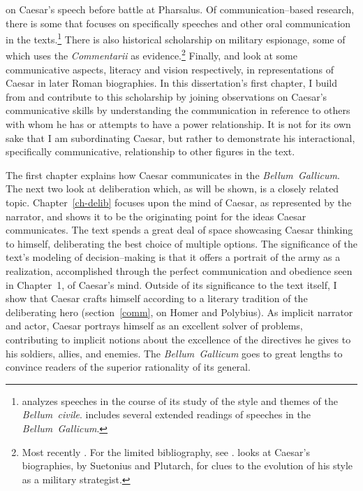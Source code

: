 \documentclass[12pt,letterpaper,oneside,final]{memoir}
\begin{document}
\textcite{nordling2005} on Caesar's speech before battle at Pharsalus. Of communication--based research, there is some that focuses on specifically speeches and other oral communication in the texts.\footnote{\textcite[56--57, 108--109, 139--142]{batstonedamon2006} analyzes speeches in the course of its study of the style and themes of the \emph{Bellum~civile}. \textcite[107--132, 184--188]{riggsby2006} includes several extended readings of speeches in the \emph{Bellum~Gallicum}.} There is also historical scholarship on military espionage, some of which uses the \emph{Commentarii} as evidence.\footnote{Most recently \textcite{ezov1996}. For the limited bibliography, see \textcite[p.~64, n.~1]{ezov1996}. \textcite{brizzi2010} looks at Caesar's biographies, by Suetonius and Plutarch, for clues to the evolution of his style as a military strategist.} Finally, \textcite{zadorojnyi2005} and \textcite{pelling2009} look at some communicative aspects, literacy and vision respectively, in representations of Caesar in later Roman biographies. In this dissertation's first chapter, I build from and contribute to this scholarship by joining observations on Caesar's communicative skills by understanding the communication in reference to others with whom he has or attempts to have a power relationship. It is not for its own sake that I am subordinating Caesar, but rather to demonstrate his interactional, specifically communicative, relationship to other figures in the text.

The first chapter explains how Caesar communicates in the \emph{Bellum~Gallicum}. The next two look at deliberation which, as will be shown, is a closely related topic. Chapter~\ref{ch-delib} focuses upon the mind of Caesar, as represented by the narrator, and shows it to be the originating point for the ideas Caesar communicates. The text spends a great deal of space showcasing Caesar thinking to himself, deliberating the best choice of multiple options. The significance of the text's modeling of decision--making is that it offers a portrait of the army as a realization, accomplished through the perfect communication and obedience seen in Chapter~1, of Caesar's mind. Outside of its significance to the text itself, I show that Caesar crafts himself according to a literary tradition of the deliberating hero (section~\ref{comm}, on Homer and Polybius). As implicit narrator and actor, Caesar portrays himself as an excellent solver of problems, contributing to implicit notions about the excellence of the directives he gives to his soldiers, allies, and enemies. The \emph{Bellum~Gallicum} goes to great lengths to convince readers of the superior rationality of its general.
\end{document}
